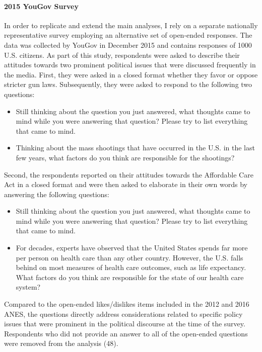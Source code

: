\paragraph{2015 YouGov Survey}
In order to replicate and extend the main analyses, I rely on a separate nationally representative survey employing an alternative set of open-ended responses. The data was collected by YouGov in December 2015 and contains responses of 1000 U.S. citizens. %
As part of this study, respondents were asked to describe their attitudes towards two prominent political issues that were discussed frequently in the media. First, they were asked in a closed format whether they favor or oppose stricter gun laws. Subsequently, they were asked to respond to the following two questions:
\begin{itemize}\setlength\itemsep{0em}
	\item Still thinking about the question you just answered, what thoughts came to mind while you were answering that question? Please try to list everything that came to mind.
	\item Thinking about the mass shootings that have occurred in the U.S. in the last few years, what factors do you think are responsible for the shootings?
\end{itemize}
Second, the respondents reported on their attitudes towards the Affordable Care Act in a closed format and were then asked to elaborate in their own words by answering the following questions:
\begin{itemize}\setlength\itemsep{0em}
	\item Still thinking about the question you just answered, what thoughts came to mind while you were answering that question? Please try to list everything that came to mind.
	\item For decades, experts have observed that the United States spends far more per person on health care than any other country. However, the U.S. falls behind on most measures of health care outcomes, such as life expectancy. What factors do you think are responsible for the state of our health care system?
\end{itemize}
Compared to the open-ended likes/dislikes items included in the 2012 and 2016 ANES, the questions directly address considerations related to specific policy issues that were prominent in the political discourse at the time of the survey. Respondents who did not provide an answer to all of the open-ended questions were removed from the analysis (48).

